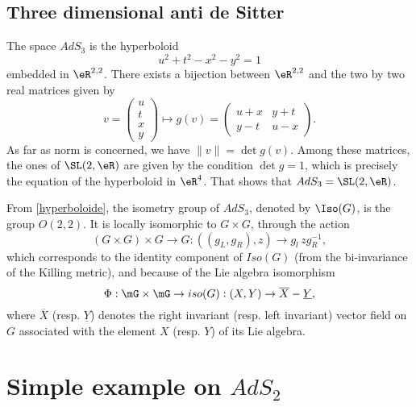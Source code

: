 \subsection{Three dimensional anti de Sitter}		\label{SubsecGpAdsDeux}

The space $AdS_3$ is the hyperboloid
\begin{equation} \label{hyperboloide}
	u^2 + t^2 - x^2 - y^2 = 1
\end{equation}
embedded in $\eR^{2,2}$. There exists a bijection between $\eR^{2,2}$ and the two by two real matrices given by
\[
	v= \begin{pmatrix}
		u \\t\\x\\y
	\end{pmatrix}
	\mapsto
	g(v)=\begin{pmatrix}
		u+x & y+t \\
		y-t & u-x
	\end{pmatrix}.
\]
As far as norm is concerned, we have $\| v \|=\det g(v)$. Among these matrices, the ones of $\SL(2,\eR)$ are given by the condition $\det g=1$, which is precisely the equation of the hyperboloid in $\eR^{4}$. That shows that $AdS_3=\SL(2,\eR)$.

From \eqref{hyperboloide}, the isometry group of $AdS_3$, denoted by $\Iso(G)$, is the group $O(2,2)$. It is locally isomorphic to $G \times G$, through the action
\begin{equation}
	(G \times G) \times G \longrightarrow G \colon((g_L,g_R),z)
	\rightarrow g_l \, z g_R^{-1},
\end{equation}
which corresponds to the identity component of $Iso(G)$ (from the bi-invariance of the Killing metric), and because of the Lie algebra isomorphism
\begin{equation}\label{Iso}
	\Phi: \mG \times \mG \rightarrow iso(G) : (X,Y)
	\rightarrow  \overline{X} - \underline{Y},
\end{equation}
where $\overline{X}$ (resp. $\underline{Y}$) denotes the right invariant (resp. left invariant) vector field on $G$ associated with the element $X$ (resp. $Y$) of its Lie algebra.

\section{Simple example on \texorpdfstring{$AdS_{2}$}{AdS2}}\label{sec_AdSdeux}

